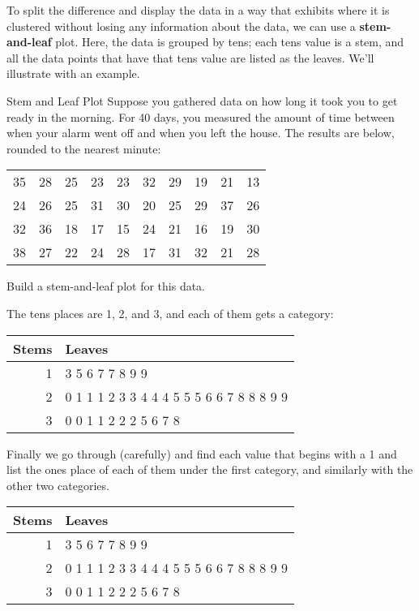 To split the difference and display the data in a way that exhibits where it is clustered without losing any information about the data, we can use a \textbf{stem-and-leaf} plot.  Here, the data is grouped by tens; each tens value is a stem, and all the data points that have that tens value are listed as the leaves.  We'll illustrate with an example.
\pagebreak

\begin{example}[https://www.youtube.com/watch?v=cLs37HcHZB0&list=PLfmpjsIzhzttL_Uec2nCbDRcAcUF7NKG8&index=12]{Stem and Leaf Plot}
Suppose you gathered data on how long it took you to get ready in the morning.  For 40 days, you measured the amount of time between when your alarm went off and when you left the house.  The results are below, rounded to the nearest minute:
\begin{center}
\begin{tabular}{c c c c c c c c c c}
35 & 28 & 25 & 23 & 23 & 32 & 29 & 19 & 21 & 13\\
24 & 26 & 25 & 31 & 30 & 20 & 25 & 29 & 37 & 26\\
32 & 36 & 18 & 17 & 15 & 24 & 21 & 16 & 19 & 30\\
38 & 27 & 22 & 24 & 28 & 17 & 31 & 32 & 21 & 28\\
\end{tabular}
\end{center}
Build a stem-and-leaf plot for this data.

\sol
The tens places are 1, 2, and 3, and each of them gets a category:
\begin{center}
\begin{tabular}{r | l}
Stems & Leaves\\
\hline
1 & {\color{white}3 5 6 7 7 8 9 9}\\
2 & {\color{white}0 1 1 1 2 3 3 4 4 4 5 5 5 6 6 7 8 8 8 9 9}\\
3 & {\color{white}0 0 1 1 2 2 2 5 6 7 8}
\end{tabular}
\end{center}

Finally we go through (carefully) and find each value that begins with a 1 and list the ones place of each of them under the first category, and similarly with the other two categories.
\begin{center}
\begin{tabular}{r | l}
Stems & Leaves\\
\hline
1 & 3 5 6 7 7 8 9 9\\
2 & 0 1 1 1 2 3 3 4 4 4 5 5 5 6 6 7 8 8 8 9 9\\
3 & 0 0 1 1 2 2 2 5 6 7 8
\end{tabular}
\end{center}
\end{example}

